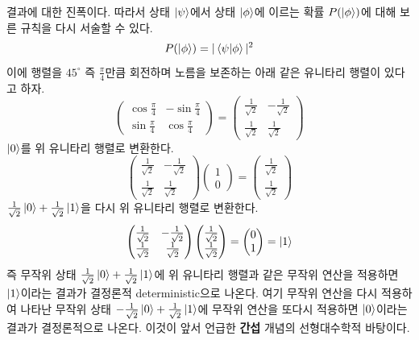 \documentclass[a4paper,chapter,atbegshi]{oblivoir}
\begin{document}
결과에 대한 진폭이다. 따라서 상태 $\ket\psi$에서 상태 $\ket\phi$에 이르는
확률 $P(\ket\phi)$에 대해 보른 규칙을 다시 서술할 수 있다.
\[
  P(\ket\phi)=|\braket{\psi|\phi}|^2
\]
이에 행렬을 $45^{\circ}$ 즉 $\frac{\pi}{4}$만큼 회전하며 노름을 보존하는
아래 같은 유니타리 행렬이 있다고 하자.
\[
  \begin{pmatrix}
    \cos\frac{\pi}{4} &-\sin\frac{\pi}{4}\\
    \sin\frac{\pi}{4} &\cos\frac{\pi}{4}
  \end{pmatrix}
  = \begin{pmatrix}
    \frac{1}{\sqrt{2}} &-\frac{1}{\sqrt{2}} \\
    \frac{1}{\sqrt{2}} &\frac{1}{\sqrt2}
  \end{pmatrix}
\]
$\ket0$를 위 유니타리 행렬로 변환한다.
\begin{equation}\label{eq:1-2}
  \begin{pmatrix}
    \frac{1}{\sqrt{2}} &-\frac{1}{\sqrt{2}} \\
    \frac{1}{\sqrt{2}} &\frac{1}{\sqrt2}
  \end{pmatrix}
  \begin{pmatrix}
    1\\0
  \end{pmatrix}
  =\begin{pmatrix}
    \frac{1}{\sqrt2}\\\frac{1}{\sqrt2}
  \end{pmatrix}
\end{equation}
$\frac{1}{\sqrt2}\ket{0}+\frac{1}{\sqrt2}\ket{1}$을 다시 위 유니타리 행렬로
변환한다.
\[
  \begin{pmatrix}
    \frac{1}{\sqrt{2}} &-\frac{1}{\sqrt{2}} \\
    \frac{1}{\sqrt{2}} &\frac{1}{\sqrt2}
  \end{pmatrix}
  \begin{pmatrix}
    \frac{1}{\sqrt2}\\\frac{1}{\sqrt2}
  \end{pmatrix}
  =\begin{pmatrix}0\\1\end{pmatrix}=\ket{1}
\]
즉 무작위 상태 $\frac{1}{\sqrt2}\ket{0}+\frac{1}{\sqrt2}\ket{1}$에 위 유니타리
행렬과 같은 무작위 연산을 적용하면 $\ket{1}$이라는 결과가 결정론적{\tiny
deterministic}으로 나온다. 여기 무작위 연산을 다시 적용하여 나타난 무작위 상태
 $-\frac{1}{\sqrt2}\ket{0}+\frac{1}{\sqrt2}\ket{1}$에 무작위 연산을 또다시
 적용하면 $\ket{0}$이라는 결과가 결정론적으로 나온다. 이것이 앞서 언급한
 \textbf{간섭} 개념의 선형대수학적 바탕이다. 
\end{document}

